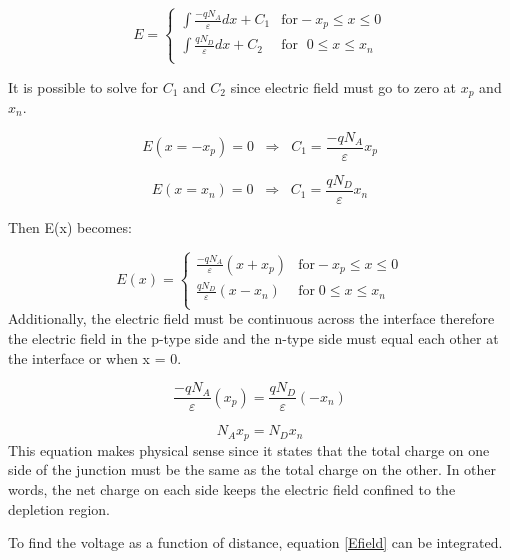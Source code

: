 \begin{equation}
E = \begin{cases}
       \int \frac{-qN_{A}}{\varepsilon}  dx+ C_{1} & \text{for}  -x_{p}\leq x \leq 0 \\
       \int \frac{qN_{D}}{\varepsilon} dx+ C_{2}   & \text{for } \; 0 \leq x \leq x_{n}  \\
     \end{cases}
\end{equation}

It is possible to solve for $C_{1}$ and $C_{2}$ since electric field must go to zero at $x_{p}$ and $x_{n}$.

\begin{equation}
E(x=-x_{p})=0  \; \;  \Rightarrow  \;\; C_{1}= \frac{-qN_{A}}{\varepsilon}x_{p}
\end{equation}

\begin{equation}
E(x=x_{n})=0  \; \;  \Rightarrow  \;\; C_{1}= \frac{qN_{D}}{\varepsilon}x_{n}
\end{equation}

Then E(x) becomes:

\begin{equation}
E(x) = \begin{cases}
         \frac{-qN_{A}}{\varepsilon}(x+x_{p}) & \text{for}  -x_{p}\leq x \leq 0 \\
         \frac{qN_{D}}{\varepsilon}(x-x_{n})  &  \text{for} \; 0 \leq x \leq x_{n}  \\
     \end{cases}
\end{equation}
 Additionally, the electric field must be continuous across the interface therefore the electric field in the p-type side and the n-type side must equal each other at the interface or when x = 0. 

\begin{equation}
\frac{-qN_{A}}{\varepsilon}(x_{p})=\frac{qN_{D}}{\varepsilon}(-x_{n})
\end{equation}

\begin{equation}
N_{A}x_{p}=N_{D}x_{n}
\label{NAeqND}
\end{equation}This equation makes physical sense since it states that the total charge on one side of the junction must be the same as the total charge on the other. In other words, the net charge on each side keeps the electric field confined to the depletion region.

To find the voltage as a function of distance, equation \ref{Efield} can be integrated.

